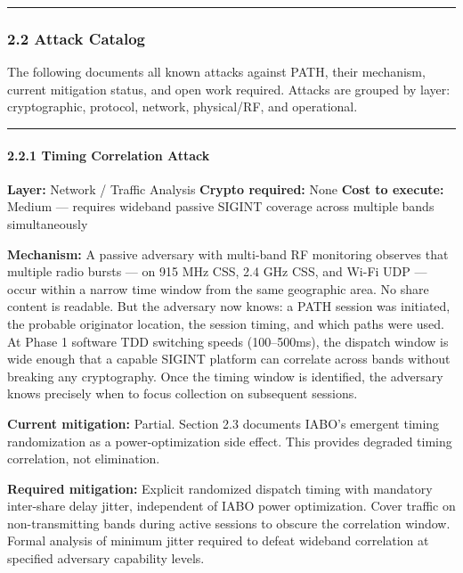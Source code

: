 \documentclass[
  11pt,
]{article}
\begin{document}
\begin{center}\rule{0.5\linewidth}{0.5pt}\end{center}

\hypertarget{attack-catalog}{%
\subsubsection{2.2 Attack Catalog}\label{attack-catalog}}

The following documents all known attacks against PATH, their mechanism,
current mitigation status, and open work required. Attacks are grouped
by layer: cryptographic, protocol, network, physical/RF, and
operational.

\begin{center}\rule{0.5\linewidth}{0.5pt}\end{center}

\hypertarget{timing-correlation-attack}{%
\paragraph{2.2.1 Timing Correlation
Attack}\label{timing-correlation-attack}}

\textbf{Layer:} Network / Traffic Analysis \textbf{Crypto required:}
None \textbf{Cost to execute:} Medium --- requires wideband passive
SIGINT coverage across multiple bands simultaneously

\textbf{Mechanism:} A passive adversary with multi-band RF monitoring
observes that multiple radio bursts --- on 915 MHz CSS, 2.4 GHz CSS, and
Wi-Fi UDP --- occur within a narrow time window from the same geographic
area. No share content is readable. But the adversary now knows: a PATH
session was initiated, the probable originator location, the session
timing, and which paths were used. At Phase 1 software TDD switching
speeds (100--500ms), the dispatch window is wide enough that a capable
SIGINT platform can correlate across bands without breaking any
cryptography. Once the timing window is identified, the adversary knows
precisely when to focus collection on subsequent sessions.

\textbf{Current mitigation:} Partial. Section 2.3 documents IABO's
emergent timing randomization as a power-optimization side effect. This
provides degraded timing correlation, not elimination.

\textbf{Required mitigation:} Explicit randomized dispatch timing with
mandatory inter-share delay jitter, independent of IABO power
optimization. Cover traffic on non-transmitting bands during active
sessions to obscure the correlation window. Formal analysis of minimum
jitter required to defeat wideband correlation at specified adversary
capability levels.
\end{document}

